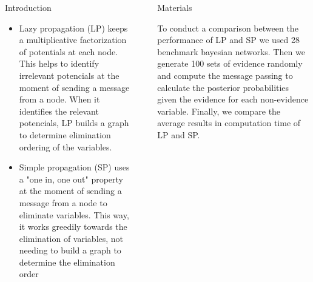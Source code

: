 \documentclass[final]{beamer}
\newlength{\sepwid}
\newlength{\onecolwid}
\newlength{\twocolwid}
\begin{document}
\begin{frame}[t]
\begin{columns}[t]
\begin{column}{\onecolwid}
\begin{block}{Introduction}
\begin{itemize}

\item Lazy propagation (LP) \cite{madsen1999} keeps a multiplicative factorization of potentials at each node. This helps to identify irrelevant potencials at the moment of sending a message from a node. When it identifies the relevant potencials, LP builds a graph to determine elimination ordering of the variables.

\item Simple propagation (SP) uses a "one in, one out" property at the moment of sending a message from a node to eliminate variables. This way, it works greedily towards the elimination of variables, not needing to build a graph to determine the elimination order

\end{itemize}


\end{block}




\end{column} %

\begin{column}{\sepwid}\end{column} %

\begin{column}{\twocolwid} %

\begin{columns}[t,totalwidth=\twocolwid] %

\begin{column}{\onecolwid}\vspace{-.6in} %


\begin{block}{Materials}

To conduct a comparison between the performance of LP and SP we used 28 benchmark bayesian networks. Then we generate 100 sets of evidence randomly and compute the message passing to calculate the posterior probabilities given the evidence for each non-evidence variable. Finally, we compare the average results in computation time of LP and SP.



\end{block}
\end{column}
\end{columns}
\end{column}
\end{columns}
\end{frame}
\end{document}
